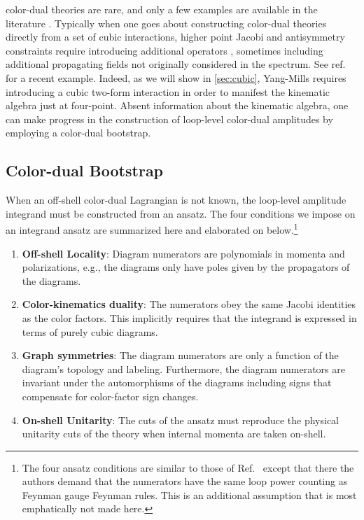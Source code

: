 \documentclass[11pt,letter]{article}
\begin{document}
color-dual theories are rare, and only a few examples are available in
the literature \cite{Monteiro2011pc, Cheung:2016prv, Cheung:2021zvb,
  Cheung:2020djz, Ben-Shahar:2022ixa, Ben-Shahar:2021zww,
  Ben-Shahar:2021doh}.
Typically when one goes about constructing color-dual
theories directly from a set of cubic interactions, higher point
Jacobi and antisymmetry constraints require introducing additional operators \cite{Carrasco:2022lbm,Carrasco:2022sck}, sometimes including additional propagating fields not originally considered in the spectrum. See ref.~\cite{Ben-Shahar:2022ixa} for a recent
example. Indeed, as we will show in \cref{sec:cubic}, Yang-Mills
requires introducing a cubic two-form interaction in order to manifest
the kinematic algebra just at four-point. Absent information about the
kinematic algebra, one can make progress in the construction of
loop-level color-dual amplitudes by employing a color-dual bootstrap.


\subsection{Color-dual Bootstrap}
\label{sec:bootstrap}

When an off-shell color-dual Lagrangian is not known, the loop-level
amplitude integrand must be constructed from an ansatz.  The four
conditions we impose on an integrand ansatz are summarized here and
elaborated on below.\footnote{The four ansatz conditions are similar
  to those of Ref.~\cite{Bern:2015ooa} except that there the authors
  demand that the numerators have the same loop power counting as
  Feynman gauge Feynman rules.  This is an additional assumption that
  is most emphatically not made here.}
\begin{enumerate}
\item \textbf{Off-shell Locality}: Diagram numerators are polynomials
  in momenta and polarizations, e.g., the diagrams only have poles given
  by the propagators of the diagrams.
\item \textbf{Color-kinematics duality}: The numerators obey the same
  Jacobi identities as the color factors.  This implicitly requires
  that the integrand is expressed in terms of purely cubic diagrams.
\item \textbf{Graph symmetries}: The diagram numerators are only a
  function of the diagram's topology and labeling.  Furthermore, the
  diagram numerators are invariant under the automorphisms of the
  diagrams including signs that compensate for color-factor sign
    changes.
\item \textbf{On-shell Unitarity}: The cuts of the ansatz must
  reproduce the physical unitarity cuts of the theory when internal
  momenta are taken on-shell.
\end{enumerate}
\end{document}
